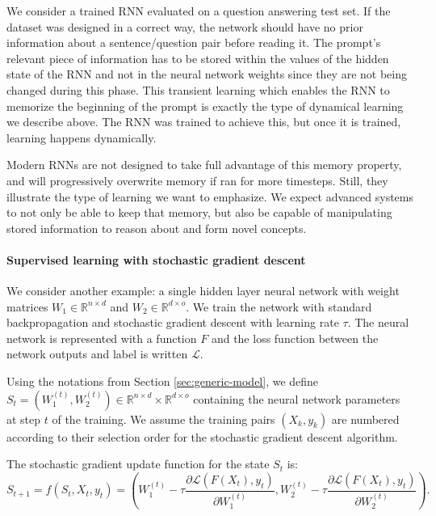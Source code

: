 We consider a trained \ac{RNN} evaluated on a question answering test set. If
the dataset was designed in a correct way, the network should have no prior
information about a sentence/question pair before reading it. The prompt's
relevant piece of information has to be stored within the values of the hidden
state of the \ac{RNN} and not in the neural network weights since they are not
being changed during this phase. This transient learning which enables the
\ac{RNN} to memorize the beginning of the prompt is exactly the type of
dynamical learning we describe above. The \ac{RNN} was trained to achieve this,
but once it is trained, learning happens dynamically.

Modern \acp{RNN} are not designed to take full advantage of this memory
property, and will progressively overwrite memory if ran for more timesteps.
Still, they illustrate the type of learning we want to emphasize. We expect
advanced systems to not only be able to keep that memory, but also be capable of
manipulating stored information to reason about and form novel concepts.

\paragraph{Supervised learning with stochastic gradient descent}
\label{sec:superv-learn-with}
We consider another example: a single hidden layer neural network with weight
matrices $W_1 \in \mathbb{R}^{n \times d}$ and $W_2 \in \mathbb{R}^{d \times o}$. We train the network with
standard backpropagation and stochastic gradient descent with learning rate $\tau$.
The neural network is represented with a function $F$ and the loss function
between the network outputs and label is written $\mathcal{L}$.

Using the notations from Section \ref{sec:generic-model}, we define
$S_{t} = \left(W_{1}^{(t)}, W_{2}^{(t)}\right) \in \mathbb{R}^{n \times d} \times \mathbb{R}^{d \times o}$
containing the neural network parameters at step $t$ of the training. We assume
the training pairs $(X_{k}, y_{k})$ are numbered according to their selection
order for the stochastic gradient descent algorithm.

The stochastic gradient update function for the state $S_{t}$ is:
\begin{equation}
  \label{eq:supervised-learning}
  S_{t+1} = {f}(S_t, X_t, y_t) = \left(W_1^{(t)} - \tau \frac{\partial
      \mathcal{L}(F(X_t), y_t)}{\partial W_1^{(t)}}, W_2^{(t)} - \tau \frac{\partial
      \mathcal{L}(F(X_t), y_t)}{\partial W_2^{(t)}} \right).
\end{equation}

